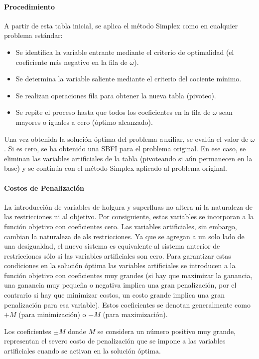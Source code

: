 \paragraph{Procedimiento}

A partir de esta tabla inicial, se aplica el método Simplex como en cualquier problema estándar:

\begin{itemize}
  \item Se identifica la variable entrante mediante el criterio de optimalidad (el coeficiente más negativo en la fila de \(\omega\)).
  \item Se determina la variable saliente mediante el criterio del cociente mínimo.
  \item Se realizan operaciones fila para obtener la nueva tabla (pivoteo).
  \item Se repite el proceso hasta que todos los coeficientes en la fila de \(\omega\) sean mayores o iguales a cero (óptimo alcanzado).
\end{itemize}

Una vez obtenida la solución óptima del problema auxiliar, se evalúa el valor de \(\omega\). Si es cero, se ha obtenido una SBFI para el problema original. En ese caso, se eliminan las variables artificiales de la tabla (pivoteando si aún permanecen en la base) y se continúa con el método Simplex aplicado al problema original.

\paragraph{Costos de Penalización}

La introducción de variables de holgura y superfluas no altera ni la naturaleza de las restricciones ni al objetivo. Por consiguiente, estas variables se incorporan a la función objetivo con coeficientes cero. Las variables artificiales, sin embargo, cambian la naturaleza de als restricciones. Ya que se agregan a un solo lado de una desigualdad, el nuevo sistema es equivalente al sistema anterior de restricciones sólo si las variables artificiales son cero. Para garantizar estas condiciones en la solución óptima las variables artificiales se introducen a la función objetivo con coeficientes muy grandes (si hay que maximizar la ganancia, una ganancia muy pequeña o negativa implica una gran penalización, por el contrario si hay que minimizar costos, un costo grande implica una gran penalización para esa variable). Estos coeficientes se denotan generalmente como \(+M\) (para minimización) o \(-M\) (para maximización).

Los coeficientes \(\pm M\) donde \(M\) se considera un número positivo muy grande, representan el severo costo de penalización que se impone a las variables artificiales cuando se activan en la solución óptima. 